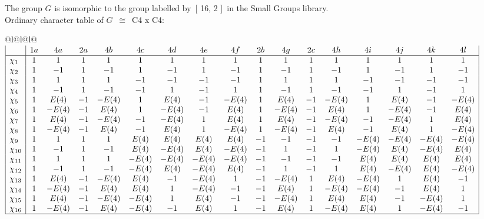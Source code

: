 \documentclass[varwidth=\maxdimen,border=10]{standalone}
\begin{document}
The group $G$ is isomorphic to the group labelled by\ [ 16, 2 ]\ in the Small Groups library.\\
Ordinary character table of $G$\ $\cong$\ C4 x C4:\\
\begin{center}
\begin{tabular}{@{}l@{}l@{}l@{}}
\hline
\(\begin{array}{|l|cccccccccccccccc|}
  & 1a & 4a & 2a & 4b & 4c & 4d & 4e & 4f & 2b & 4g & 2c & 4h & 4i & 4j & 4k & 4l\\ \hline
\chi_{1} & 1 & 1 & 1 & 1 & 1 & 1 & 1 & 1 & 1 & 1 & 1 & 1 & 1 & 1 & 1 & 1\\
\chi_{2} & 1 & -1 & 1 & -1 & 1 & -1 & 1 & -1 & 1 & -1 & 1 & -1 & 1 & -1 & 1 & -1\\
\chi_{3} & 1 & 1 & 1 & 1 & -1 & -1 & -1 & -1 & 1 & 1 & 1 & 1 & -1 & -1 & -1 & -1\\
\chi_{4} & 1 & -1 & 1 & -1 & -1 & 1 & -1 & 1 & 1 & -1 & 1 & -1 & -1 & 1 & -1 & 1\\
\chi_{5} & 1 & E(4) & -1 & -E(4) & 1 & E(4) & -1 & -E(4) & 1 & E(4) & -1 & -E(4) & 1 & E(4) & -1 & -E(4)\\
\chi_{6} & 1 & -E(4) & -1 & E(4) & 1 & -E(4) & -1 & E(4) & 1 & -E(4) & -1 & E(4) & 1 & -E(4) & -1 & E(4)\\
\chi_{7} & 1 & E(4) & -1 & -E(4) & -1 & -E(4) & 1 & E(4) & 1 & E(4) & -1 & -E(4) & -1 & -E(4) & 1 & E(4)\\
\chi_{8} & 1 & -E(4) & -1 & E(4) & -1 & E(4) & 1 & -E(4) & 1 & -E(4) & -1 & E(4) & -1 & E(4) & 1 & -E(4)\\
\chi_{9} & 1 & 1 & 1 & 1 & E(4) & E(4) & E(4) & E(4) & -1 & -1 & -1 & -1 & -E(4) & -E(4) & -E(4) & -E(4)\\
\chi_{10} & 1 & -1 & 1 & -1 & E(4) & -E(4) & E(4) & -E(4) & -1 & 1 & -1 & 1 & -E(4) & E(4) & -E(4) & E(4)\\
\chi_{11} & 1 & 1 & 1 & 1 & -E(4) & -E(4) & -E(4) & -E(4) & -1 & -1 & -1 & -1 & E(4) & E(4) & E(4) & E(4)\\
\chi_{12} & 1 & -1 & 1 & -1 & -E(4) & E(4) & -E(4) & E(4) & -1 & 1 & -1 & 1 & E(4) & -E(4) & E(4) & -E(4)\\
\chi_{13} & 1 & E(4) & -1 & -E(4) & E(4) & -1 & -E(4) & 1 & -1 & -E(4) & 1 & E(4) & -E(4) & 1 & E(4) & -1\\
\chi_{14} & 1 & -E(4) & -1 & E(4) & E(4) & 1 & -E(4) & -1 & -1 & E(4) & 1 & -E(4) & -E(4) & -1 & E(4) & 1\\
\chi_{15} & 1 & E(4) & -1 & -E(4) & -E(4) & 1 & E(4) & -1 & -1 & -E(4) & 1 & E(4) & E(4) & -1 & -E(4) & 1\\
\chi_{16} & 1 & -E(4) & -1 & E(4) & -E(4) & -1 & E(4) & 1 & -1 & E(4) & 1 & -E(4) & E(4) & 1 & -E(4) & -1\\
\hline
\end{array}\)\\
\end{tabular}
\end{center}
\end{document}
